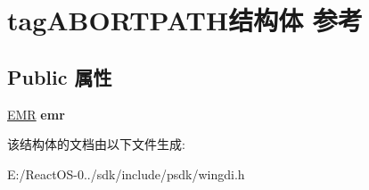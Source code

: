 \hypertarget{structtag_a_b_o_r_t_p_a_t_h}{}\section{tag\+A\+B\+O\+R\+T\+P\+A\+T\+H结构体 参考}
\label{structtag_a_b_o_r_t_p_a_t_h}
\subsection*{Public 属性}
\begin{DoxyCompactItemize}
\item 
\mbox{\label{structtag_a_b_o_r_t_p_a_t_h_a374bdeb509612eb87a787b4b0e5c58fc}} 
\hyperlink{structtag_e_m_r}{E\+MR} {\bfseries emr}
\end{DoxyCompactItemize}


该结构体的文档由以下文件生成\+:\begin{DoxyCompactItemize}
\item 
E\+:/\+React\+O\+S-\/0../sdk/include/psdk/wingdi.\+h\end{DoxyCompactItemize}
